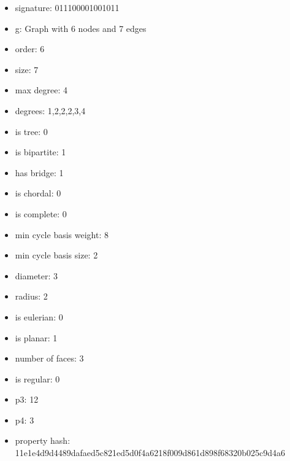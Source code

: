 \begin{itemize}
\item signature: 011100001001011
\item g: Graph with 6 nodes and 7 edges
\item order: 6
\item size: 7
\item max degree: 4
\item degrees: 1,2,2,2,3,4
\item is tree: 0
\item is bipartite: 1
\item has bridge: 1
\item is chordal: 0
\item is complete: 0
\item min cycle basis weight: 8
\item min cycle basis size: 2
\item diameter: 3
\item radius: 2
\item is eulerian: 0
\item is planar: 1
\item number of faces: 3
\item is regular: 0
\item p3: 12
\item p4: 3
\item property hash: 11e1e4d9d4489dafaed5c821ed5d0f4a6218f009d861d898f68320b025c9d4a6
\end{itemize}
\newpage
\begin{figure}
\end{figure}
